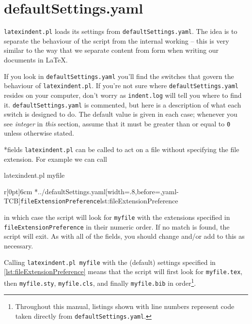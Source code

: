 \section{defaultSettings.yaml}\label{sec:defuseloc}
 \texttt{latexindent.pl} loads its settings from \texttt{defaultSettings.yaml}. The idea is to
 separate the behaviour of the script from the internal working -- this is very similar to
 the way that we separate content from form when writing our documents in \LaTeX.

 If you look in \texttt{defaultSettings.yaml} you'll find the switches that govern the behaviour
 of \texttt{latexindent.pl}. If you're not sure where \texttt{defaultSettings.yaml} resides on
 your computer, don't worry as \texttt{indent.log} will tell you where to find it.
 \texttt{defaultSettings.yaml} is commented, but here is a description of what each switch is
 designed to do. The default value is given in each case; whenever you see
 \emph{integer} in \emph{this} section, assume that it must be
 greater than or equal to \texttt{0} unless otherwise stated.

*{fields}
	\texttt{latexindent.pl} can be called to
	act on a file without specifying the file extension.  For example we can call
	\begin{commandshell}
latexindent.pl myfile
\end{commandshell}
	\begin{wrapfigure}[8]{r}[0pt]{6cm}
		\cmhlistingsfromfile[style=fileExtensionPreference]*{../defaultSettings.yaml}[width=.8\linewidth,before=\centering,yaml-TCB]{\texttt{fileExtensionPreference}}{lst:fileExtensionPreference}
	\end{wrapfigure}

	in which case the script will look for \texttt{myfile} with the extensions
	specified in \texttt{fileExtensionPreference} in their numeric order. If no match is found, the
	script will exit. As with all of the fields, you should change and/or add to this as
	necessary.

	Calling \texttt{latexindent.pl myfile} with the (default) settings specified in
	\cref{lst:fileExtensionPreference} means that the script will first look for
	\texttt{myfile.tex}, then \texttt{myfile.sty}, \texttt{myfile.cls}, and
	finally \texttt{myfile.bib} in order\footnote{Throughout this manual, listings shown with line numbers represent code
		taken directly from \texttt{defaultSettings.yaml}.}.

